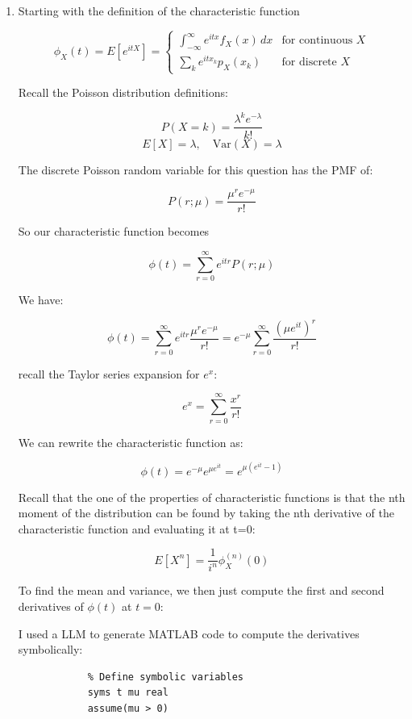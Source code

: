 \documentclass[10pt]{article}
\begin{document}
\begin{enumerate}[label=(\alph*)]
	\item Starting with the definition of the characteristic function

	      \[\phi_X(t) = E[e^{itX}] = \begin{cases} \int_{-\infty}^{\infty} e^{itx} f_X(x) \,dx & \text{for continuous } X \\ \sum_{k} e^{itx_k} p_X(x_k) & \text{for discrete } X \end{cases} \]

	      Recall the Poisson distribution definitions:

	      \[ P(X = k) = \frac{\lambda^k e^{-\lambda}}{k!} \]
	      \[ E[X] = \lambda, \quad \text{Var}(X) = \lambda \]

	      The discrete Poisson random variable for this question has the PMF of:

	      \[ P(r;\mu) = \frac{\mu^r e^{-\mu}}{r!} \]

	      So our characteristic function becomes

	      \[ \phi(t) = \sum_{r=0}^{\infty} e^{itr} P(r;\mu) \]

	      We have:

	      \[ \phi(t) = \sum_{r=0}^{\infty} e^{itr} \frac{\mu^r e^{-\mu}}{r!} = e^{-\mu} \sum_{r=0}^{\infty} \frac{(\mu e^{it})^r}{r!} \]

	      recall the Taylor series expansion for $e^x$:

	      \[ e^x = \sum_{r=0}^{\infty} \frac{x^r}{r!} \]

	      We can rewrite the characteristic function as:

	      \[ \boxed{\phi(t) = e^{-\mu} e^{\mu e^{it}} = e^{\mu (e^{it} - 1)} }\]

	      Recall that the one of the properties of characteristic functions is that the nth moment of the distribution can be found by taking the nth derivative of the characteristic function and evaluating it at t=0:

	      \[ E[X^n] = \frac{1}{i^n} \phi_X^{(n)}(0) \]

	      To find the mean and variance, we then just compute the first and second derivatives of $\phi(t)$ at $t=0$:

	      I used a LLM to generate MATLAB code to compute the derivatives symbolically:

	      \begin{verbatim}
			% Define symbolic variables
			syms t mu real
			assume(mu > 0)


\end{verbatim}
\end{enumerate}
\end{document}
